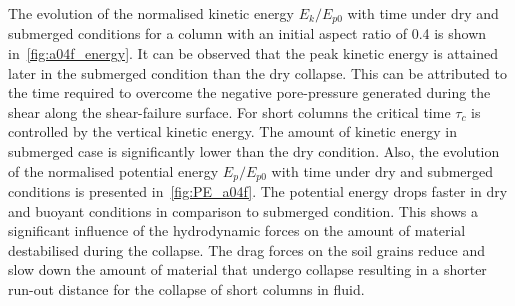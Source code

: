 The evolution of the normalised kinetic energy $E_k / E_{p0}$ with time under 
dry 
and submerged conditions for a column with an initial aspect ratio of 0.4 is 
shown in~\cref{fig:a04f_energy}. It can be 
observed that the peak kinetic energy is attained later in the submerged 
condition than the dry collapse. This can be attributed to the time required to 
overcome the negative pore-pressure generated during the shear along the 
shear-failure surface. For short columns the critical time $\tau_c$ is 
controlled by 
the vertical kinetic energy. The amount of kinetic energy in submerged case is 
significantly lower than the dry condition. Also, the evolution of the 
normalised potential energy $E_{p}/E_{p0}$ with time under dry and submerged 
conditions is presented in~\cref{fig:PE_a04f}. The potential energy drops 
faster in dry and buoyant conditions in comparison to submerged condition. This 
shows a significant influence of the hydrodynamic forces on the amount of 
material destabilised during the collapse. The drag forces on the soil grains 
reduce and slow down the amount of material that undergo collapse resulting in 
a shorter run-out distance for the collapse of short columns in fluid. 
